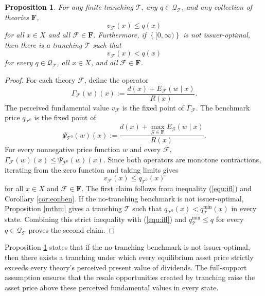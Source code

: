 \documentclass[11pt]{article}
\theoremstyle{plain}
\newtheorem{prp}{Proposition}%
\begin{document}
\begin{prp} \label{prp:fun}
For any finite tranching $\mathcal{T}$, any $q\in\mathcal{Q}_{\mathcal{T}}$, and any collection of theories $\mathbf{F}$,
\begin{equation*}
v_\mathcal{F}(x)
\leq q(x)
\end{equation*}
for all $x\in X$ and all $\mathcal{F}\in\mathbf{F}$. Furthermore, if $\left\{[0,\infty)\right\}$ is not issuer-optimal, then there is a tranching $\mathcal{T}$ such that
\begin{equation*}
v_\mathcal{F}(x)
< q(x)
\end{equation*}
for every $q\in\mathcal{Q}_{\mathcal{T}}$, all $x\in X$, and all $\mathcal{F}\in\mathbf{F}$.
\end{prp}

\begin{proof}
For each theory $\mathcal{F}$, define the operator
\[
\Gamma_\mathcal{F}(w)(x):=
\frac{d(x)+E_{\mathcal{F}}\left(w\mid x\right)}{R(x)}.
\]
The perceived fundamental value $v_\mathcal{F}$ is the fixed point of $\Gamma_\mathcal{F}$. The benchmark price $q_{\mathcal{T}^0}$ is the fixed point of
\[
\Psi_{\mathcal{T}^0}(w)(x):=
\frac{d(x)+\max_{\mathcal{G}\in\mathbf{F}}E_{\mathcal{G}}\left(w\mid x\right)}
{R(x)}.
\]
For every nonnegative price function $w$ and every $\mathcal{F}$, $\Gamma_\mathcal{F}(w)(x)\leq \Psi_{\mathcal{T}^0}(w)(x)$. Since both operators are monotone contractions, iterating from the zero function and taking limits gives
\begin{equation} \label{equ:ifl}
v_\mathcal{F}(x)
\leq q_{\mathcal{T}^0}(x)
\end{equation}
for all $x\in X$ and $\mathcal{F}\in\mathbf{F}$. The first claim follows from inequality (\ref{equ:ifl}) and Corollary \ref{cor:eonben}. If the no-tranching benchmark is not issuer-optimal, Proposition \ref{mthm} gives a tranching $\mathcal{T}$ such that $q_{\mathcal{T}^0}(x)<q_{\mathcal{T}}^{\min}(x)$ in every state. Combining this strict inequality with (\ref{equ:ifl}) and $q_{\mathcal{T}}^{\min}\leq q$ for every $q\in\mathcal{Q}_{\mathcal{T}}$ proves the second claim.
\end{proof}

Proposition \ref{prp:fun} states that if the no-tranching benchmark is not issuer-optimal, then there exists a tranching under which every equilibrium asset price strictly exceeds every theory's perceived present value of dividends. The full-support assumption ensures that the resale opportunities created by tranching raise the asset price above these perceived fundamental values in every state.
\end{document}
